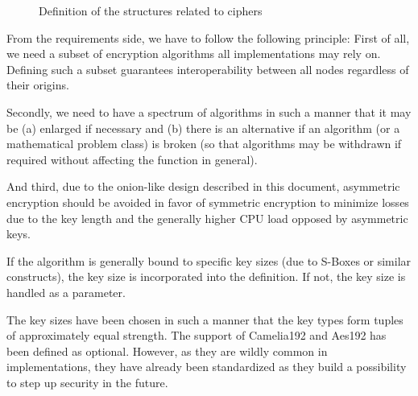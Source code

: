 \begin{figure}[ht]

\caption{Definition of the structures related to ciphers}
\label{fig:defCiphers}
\end{figure}

From the requirements side, we have to follow the following principle:
First of all, we need a subset of encryption algorithms all implementations may rely on. Defining such a subset guarantees interoperability between all nodes regardless of their origins. 

Secondly, we need to have a spectrum of algorithms in such a manner that it may be (a) enlarged if necessary and (b) there is an alternative if an algorithm (or a mathematical problem class) is broken (so that algorithms may be withdrawn if required without affecting the function in general). 

And third, due to the onion-like design described in this document, asymmetric encryption should be avoided in favor of symmetric encryption to minimize losses due to the key length and the generally higher CPU load opposed by asymmetric keys.

If the algorithm is generally bound to specific key sizes (due to S-Boxes or similar constructs), the key size is incorporated into the definition. If not, the key size is handled as a parameter.

The key sizes have been chosen in such a manner that the key types form tuples of approximately equal strength. The support of Camelia192 and Aes192 has been defined as optional. However, as they are wildly common in implementations, they have already been standardized as they build a possibility to step up security in the future.

